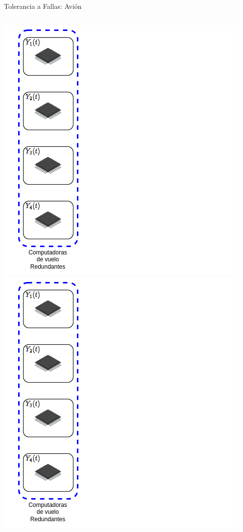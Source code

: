 \begin{frame}{Tolerancia a Fallas: Avión}
\begin{columns}
\begin{overprint}
				\includegraphics[width=\textwidth]{img/calculo_actuacion_1.png}
				\onslide<3>\includegraphics[width=\textwidth]{img/calculo_actuacion_1.png}

\end{overprint}
\end{columns}
\end{frame}
